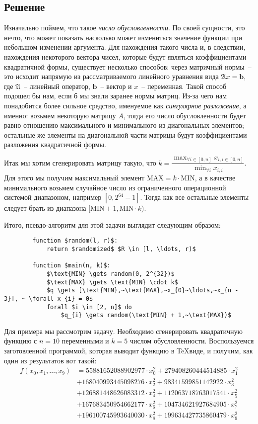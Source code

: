 \documentclass[12pt, a4paper, oneside]{article}
\begin{document}
	\subsection*{Решение}
	Изначально поймем, что такое \textit{число обусловленности}. По своей сущности, это нечто, что может показать насколько может измениться значение функции при небольшом изменении аргумента. Для нахождения такого числа и, в следствии, нахождения некоторого вектора чисел, которые будут являться коэффициентами квадратичной формы, существует несколько способов: через матричный нормы~-- это исходит напрямую из рассматриваемого линейного уравнения вида $\mathfrak{A}x = \mathbf{b}$, где $\mathfrak{A}$~-- линейный оператор, $\mathbf{b}$~-- вектор и $x$~-- переменная. Такой способ подошел бы нам, если б мы знали заранее нормы матриц. Из-за чего нам понадобится более сильное средство, именуемое как \textit{сингулярное разложение}, а именно: возьмем некоторую матрицу $A$, тогда его число обусловленности будет равно отношению максимального и минимального из диагональных элементов; остальные же элементы на диагональной части матрицы будут коэффициентами разложения квадратичной формы.

	Итак мы хотим сгенерировать матрицу такую, что $k = \dfrac{\max_{\forall i \in [0, n]}{x_{i, i \in [0, n]}}}{\min_{\forall i}{x_{i, i}}}$. Для этого мы получим максимальный элемент $\text{MAX} = k \cdot \text{MIN}$, а в качестве минимального возьмем случайное число из ограниченного операционной системой диапазоном, например $[0, 2^{64} - 1]$. Тогда как все остальные элементы следует брать из диапазона $[\text{MIN} + 1, \text{MIN} \cdot k)$.

	Итого, псевдо-алгоритм для этой задачи выглядит следующим образом:
	\begin{lstlisting}
		function $random(l, r)$:
			return $randomized$ $R \in [l, \ldots, r)$
		
		function $main(n, k)$:
			$\text{MIN} \gets random(0, 2^{32})$
			$\text{MAX} \gets \text{MIN} \cdot k$
			$q \gets [\text{MIN},~\text{MAX},~x_{0}~\ldots,~x_{n - 3}], ~ \forall x_{i} = 0$
			forall $i \in [2, n]$ do
				$q_{i} \gets random(\text{MIN} + 1,~\text{MAX})$
	\end{lstlisting}
	Для примера мы рассмотрим задачу. Необходимо сгенерировать квадратичную функцию с $n = 10$ переменными и $k = 5$ числом обусловленности. Воспользуемся заготовленной программой, которая выводит функцию в \TeX виде, и получим, как один из результатов вот такой:
	\begin{align*}
		f(x_0, x_1, \ldots, x_9) &= 55881652088902977 \cdot x^2_0 + 279408260444514885 \cdot x^2_1 \\
		&+ 168040993445098276 \cdot x^2_2 + 98341599851142922 \cdot x^2_3 \\
		&+ 126881448626083312 \cdot x^2_4 + 112063718763017541 \cdot x^2_5 \\
		&+ 167683450954662177 \cdot x^2_6 + 104734621927684905 \cdot x^2_7 \\
		&+ 196100745993640030 \cdot x^2_8 + 199634427735860479 \cdot x^2_9
	\end{align*}
\end{document}
